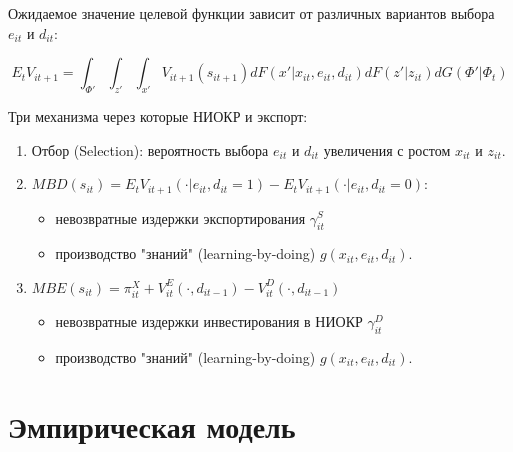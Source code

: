 \documentclass[c, dvipsnames]{beamer}  %
\begin{document}
\begin{frame}[shrink=3]
\frametitle{\insertsection} 

Ожидаемое значение целевой функции зависит от различных вариантов выбора  $e_{it}$ и $d_{it}$:

$$E_tV_{it+1} = \int_{\Phi'} \int_{z'} \int_{x'} V_{it+1}(s_{it+1})dF(x'|x_{it}, e_{it}, d_{it})dF(z'|z_{it})dG(\Phi'|\Phi_t)$$

Три механизма через которые  НИОКР и экспорт: 

\begin{enumerate}
	\item  Отбор (Selection): вероятность выбора $e_{it}$ и $d_{it}$ увеличения с ростом  $x_{it}$ и $z_{it}$.

\item  $MBD(s_{it}) = E_tV_{it+1}(\cdot|e_{it}, d_{it} = 1) - E_tV_{it+1}(\cdot|e_{it}, d_{it} = 0)$: 

\begin{itemize}
	\item невозвратные издержки экспортирования $\gamma^S_{it}$
\item производство "знаний" (learning-by-doing) $g(x_{it}, e_{it}, d_{it} )$.

\end{itemize}
\item  $MBE(s_{it}) = \pi^X_{it} + V^E_{it} (\cdot, d_{it−1}) - V^D_{it} (\cdot, d_{it−1})$
\begin{itemize}
	\item невозвратные издержки инвестирования в НИОКР $\gamma^D_{it}$
\item производство "знаний" (learning-by-doing) $g(x_{it}, e_{it}, d_{it} )$.

\end{itemize}
\end{enumerate}

\end{frame}




\section{Эмпирическая модель}
\end{document}
